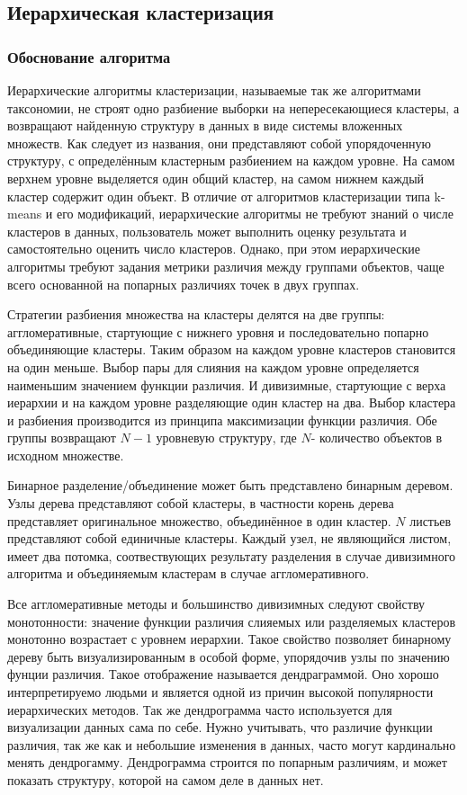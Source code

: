 \subsection{Иерархическая кластеризация}

\subsubsection{Обоснование алгоритма}

Иерархические алгоритмы кластеризации, называемые так же алгоритмами таксономии, не строят одно разбиение выборки на непересекающиеся кластеры, а возвращают найденную структуру в данных в виде системы вложенных множеств. Как следует из названия, они представляют собой упорядоченную структуру, с определённым кластерным разбиением на каждом уровне. На самом верхнем уровне выделяется один общий кластер, на самом нижнем каждый кластер содержит один объект. В отличие от алгоритмов кластеризации типа k-means и его модификаций, иерархические алгоритмы не требуют знаний о числе кластеров в данных, пользователь может выполнить оценку результата и самостоятельно оценить число кластеров. Однако, при этом иерархические алгоритмы требуют задания метрики различия между группами объектов, чаще всего основанной на попарных различиях точек в двух группах\cite{oyelade2016clustering}. 

Стратегии разбиения множества на кластеры делятся на две группы: аггломеративные, стартующие с нижнего уровня и последовательно попарно объединяющие кластеры. Таким образом на каждом уровне кластеров становится на один меньше. Выбор пары для слияния на каждом уровне определяется наименьшим значением функции различия. И дивизимные, стартующие с верха иерархии и на каждом уровне разделяющие один кластер на два. Выбор кластера и разбиения производится из принципа максимизации функции различия. Обе группы возвращают $N-1$ уровневую структуру, где $N$- количество объектов в исходном множестве.

Бинарное разделение/объединение может быть представлено бинарным деревом. Узлы дерева представляют собой кластеры, в частности корень дерева представляет оригинальное множество, объединённое в один кластер. $N$ листьев представляют собой единичные кластеры. Каждый узел, не являющийся листом, имеет два потомка, соотвествующих результату разделения в случае дивизимного алгоритма и объединяемым кластерам в случае аггломеративного. 

Все аггломеративные методы и большинство дивизимных следуют свойству монотонности: значение функции различия слияемых или разделяемых кластеров монотонно возрастает с уровнем иерархии. Такое свойство позволяет бинарному дереву быть визуализированным в особой форме, упорядочив узлы по значению фунции различия. Такое отображение называется дендраграммой. Оно хорошо интерпретируемо людьми и является одной из причин высокой популярности иерархических методов. Так же дендрограмма часто используется для визуализации данных сама по себе. Нужно учитывать, что различие функции различия, так же как и небольшие изменения в данных, часто могут кардинально менять дендрогамму. Дендрограмма строится по попарным различиям, и может показать структуру, которой на самом деле в данных нет.

